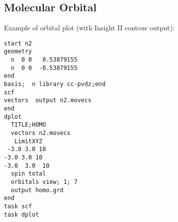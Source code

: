 \subsection*{Molecular Orbital}

Example of orbital plot (with Insight II contour output):
\begin{verbatim}
start n2
geometry
  n  0 0   0.53879155
  n  0 0  -0.53879155
end
basis;  n library cc-pvdz;end
scf
vectors  output n2.movecs
end
dplot
  TITLE;HOMO
  vectors n2.movecs
   LimitXYZ
 -3.0 3.0 10  
-3.0 3.0 10 
-3.0  3.0  10
  spin total
  orbitals view; 1; 7
  output homo.grd
end
task scf     
task dplot
\end{verbatim}
